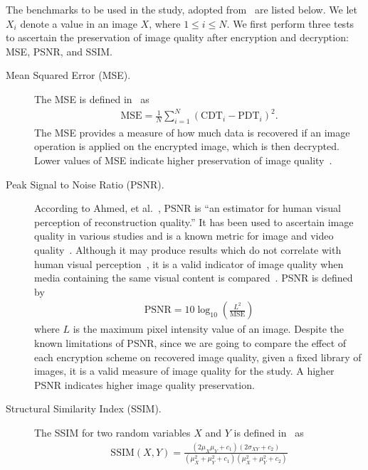 The benchmarks to be used in the study, adopted from~\cite{ahmed_benchmark_2016, ahmad_efficiency_2012, wu_npcr_2011} are listed below. We let $X_i$ denote a value in an image $X$, where $1 \leq i \leq N$.
We first perform three tests to ascertain the preservation of image quality after encryption and decryption: MSE, PSNR, and SSIM.
\begin{description}
	\item [Mean Squared Error (MSE).] The MSE is defined in~\cite{ahmed_benchmark_2016} as
	\begin{align}
        \mathrm{MSE} = \frac{1}{N}\sum_{i=1}^{N}{(\mathrm{CDT}_i - \mathrm{PDT}_i)^2}.
	\end{align}
	The MSE provides a measure of how much data is recovered if an image operation is applied on the encrypted image, which is then decrypted. Lower values of MSE indicate higher preservation of image quality~\cite{ahmed_benchmark_2016, ahmad_efficiency_2012}.
	\item [Peak Signal to Noise Ratio (PSNR).]
	According to Ahmed, et al.~\cite{ahmed_benchmark_2016}, PSNR is ``an estimator for human visual perception of reconstruction quality.'' It has been used to ascertain image quality in various studies and is a known metric for image and video quality~\cite{upmanyu_efficient_2009, jain_image_2016, akramullah_video_2014}. Although it may produce results which do not correlate with human visual perception~\cite{huynh-thu_accuracy_2012, ahmed_benchmark_2016}, it is a valid indicator of image quality when media containing the same visual content is compared~\cite{huynh-thu_accuracy_2012}.
	PSNR is defined by
	\begin{align}
        \mathrm{PSNR} = 10\log_{10}{\left( \frac{L^2}{\mathrm{MSE}} \right)}
	\end{align}
	where $L$ is the maximum pixel intensity value of an image.
	Despite the known limitations of PSNR, since we are going to compare the effect of each encryption scheme on recovered image quality, given a fixed library of images, it is a valid measure of image quality for the study. A higher PSNR indicates higher image quality preservation.
	\item [Structural Similarity Index (SSIM).]
	The SSIM for two random variables $X$ and $Y$ is defined in~\cite{ahmed_benchmark_2016, akramullah_video_2014} as
	\begin{align}
        \mathrm{SSIM}(X,Y) = \frac{(2\mu_X\mu_Y+c_1)(2\sigma_{XY}+c_2)}{(\mu_X^2+\mu_Y^2+c_1)(\mu_X^2+\mu_Y^2+c_2)}
	\end{align}

\end{description}
